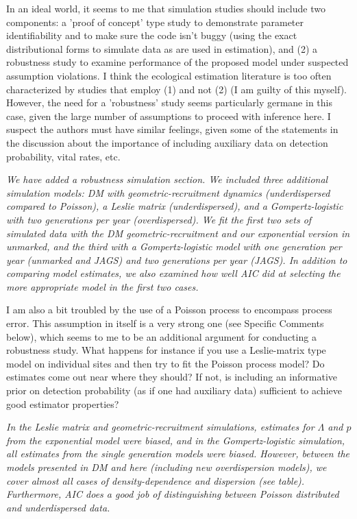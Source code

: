 \documentclass[12pt,english]{article}
\begin{document}
\begin{spacing}{1.9}
\begin{flushleft}
In an ideal world, it seems to me that simulation studies should include two components: a 
'proof of concept' type study to demonstrate parameter identifiability and to make sure the code 
isn't buggy (using the exact distributional forms to simulate data as are used in estimation), and 
(2) a robustness study to examine performance of the proposed model under suspected assumption 
violations. I think the ecological estimation literature is too often characterized by studies that 
employ (1) and not (2) (I am guilty of this myself). However, the need for a 'robustness' study seems 
particularly germane in this case, given the large number of assumptions to proceed with inference here. 
I suspect the authors must have similar feelings, given some of the statements in the discussion about 
the importance of including auxiliary data on detection probability, vital rates, etc.

\textit{We have added a robustness simulation section. We included three additional simulation models:
DM with geometric-recruitment dynamics (underdispersed compared to Poisson), a Leslie matrix (underdispersed),
and a Gompertz-logistic with two generations per year (overdispersed). We fit the first two sets of simulated
data with the DM geometric-recruitment and our exponential version in unmarked, and the third with
a Gompertz-logistic model with one generation per year (unmarked and JAGS) and two generations
per year (JAGS).  In addition to comparing model estimates, we also examined how well AIC did at
selecting the more appropriate model in the first two cases.}

I am also a bit troubled by the use of a Poisson process to encompass process error. This assumption 
in itself is a very strong one (see Specific Comments below), which seems to me to be an additional 
argument for conducting a robustness study. What happens for instance if you use a Leslie-matrix 
type model on individual sites and then try to fit the Poisson process model? Do estimates come out 
near where they should? If not, is including an informative prior on detection probability (as if one 
had auxiliary data) sufficient to achieve good estimator properties?

\textit{In the Leslie matrix and geometric-recruitment simulations, estimates for $\Lambda$ and $p$ from
the exponential model were biased, and in the Gompertz-logistic simulation, all estimates from the single
generation models were biased.  However, between the models presented in DM and here (including new 
overdispersion models), we cover almost
all cases of density-dependence and dispersion (see table).  Furthermore, AIC does a good job of distinguishing
between Poisson distributed and underdispersed data.}


\end{flushleft}
\end{spacing}
\end{document}
